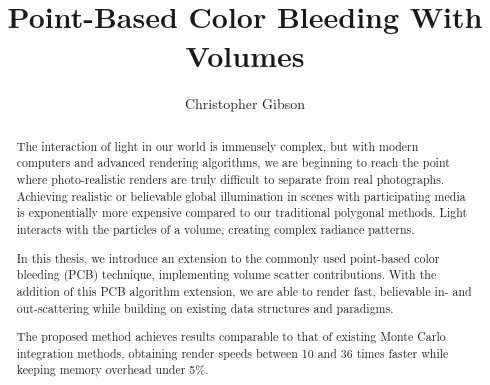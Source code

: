 \documentclass[12pt]{ucthesis}
\begin{document}

\title{Point-Based Color Bleeding With Volumes}
\author{Christopher Gibson}
  
 
     



\maketitle

\begin{frontmatter}

\copyrightpage

\committeemembershippage

\begin{abstract}

The interaction of light in our world is immensely complex, but with modern computers and advanced rendering algorithms, we are beginning to reach the point where photo-realistic renders are truly difficult to separate from real photographs.  Achieving realistic or believable global illumination in scenes with participating media is exponentially more expensive compared to our traditional polygonal methods.  Light interacts with the particles of a volume, creating complex radiance patterns.

In this thesis, we introduce an extension to the commonly used point-based color bleeding (PCB) technique, implementing volume scatter contributions.  With the addition of this PCB algorithm extension, we are able to render fast, believable in- and out-scattering while building on existing data structures and paradigms.

The proposed method achieves results comparable to that of existing Monte Carlo integration methods, obtaining render speeds between 10 and 36 times faster while keeping memory overhead under 5\%.

\end{abstract}





\tableofcontents


\listoftables

\listoffigures

\end{frontmatter}
\end{document}
